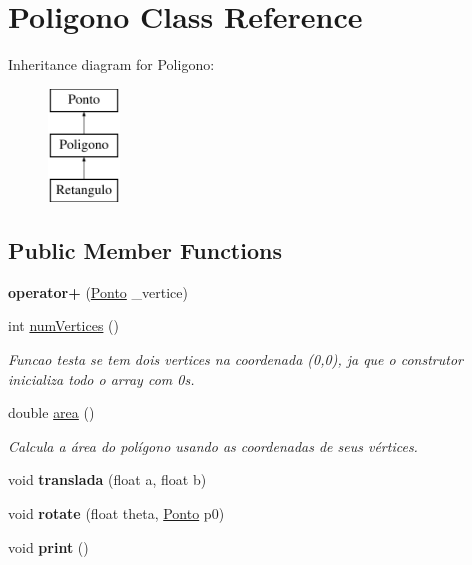 \hypertarget{class_poligono}{}\section{Poligono Class Reference}
\label{class_poligono}
Inheritance diagram for Poligono\+:\begin{figure}[H]
\begin{center}
\leavevmode
\includegraphics[height=3.000000cm]{class_poligono}
\end{center}
\end{figure}
\subsection*{Public Member Functions}
\begin{DoxyCompactItemize}
\item 
\mbox{\label{class_poligono_a2090353a8a6d5ea1edee35813e887be0}} 
{\bfseries operator+} (\hyperlink{class_ponto}{Ponto} \+\_\+vertice)
\item 
int \hyperlink{class_poligono_a85c509901a031000fc3b9247de2a8d76}{num\+Vertices} ()
\begin{DoxyCompactList}\small\item\em Funcao testa se tem dois vertices na coordenada (0,0), ja que o construtor inicializa todo o array com 0s. \end{DoxyCompactList}\item 
double \hyperlink{class_poligono_a7490b5dcca22558b603f6c1f735f3678}{area} ()
\begin{DoxyCompactList}\small\item\em Calcula a área do polígono usando as coordenadas de seus vértices. \end{DoxyCompactList}\item 
\mbox{\label{class_poligono_adbf605dfd0419b7301c9be0ec1dbe41b}} 
void {\bfseries translada} (float a, float b)
\item 
\mbox{\label{class_poligono_a77ff612d3950815e1856e284b144e1c2}} 
void {\bfseries rotate} (float theta, \hyperlink{class_ponto}{Ponto} p0)
\item 
\mbox{\label{class_poligono_ac22d76a087d08ea82627be416404ae15}} 
void {\bfseries print} ()
\end{DoxyCompactItemize}


